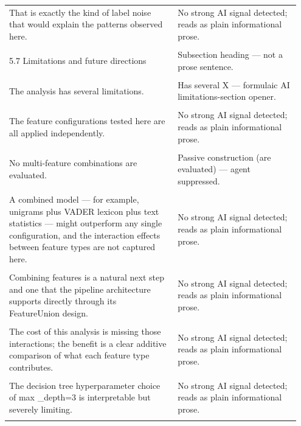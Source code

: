 \documentclass[11pt]{article}
\begin{document}
\begin{longtable}{|p{0.55\linewidth}|p{0.40\linewidth}|}
\hline
\rule{0pt}{3.5cm} & \\
\hline
That is exactly the kind of label noise that would explain the patterns observed here. & No strong AI signal detected; reads as plain informational prose. \\[2pt]
\hline
\rule{0pt}{3.5cm} & \\
\hline
5.7 Limitations and future directions & Subsection heading --- not a prose sentence. \\[2pt]
\hline
\rule{0pt}{3.5cm} & \\
\hline
The analysis has several limitations. & Has several X --- formulaic AI limitations-section opener. \\[2pt]
\hline
\rule{0pt}{3.5cm} & \\
\hline
The feature configurations tested here are all applied independently. & No strong AI signal detected; reads as plain informational prose. \\[2pt]
\hline
\rule{0pt}{3.5cm} & \\
\hline
No multi-feature combinations are evaluated. & Passive construction (are evaluated) --- agent suppressed. \\[2pt]
\hline
\rule{0pt}{3.5cm} & \\
\hline
A combined model --- for example, unigrams plus VADER lexicon plus text statistics --- might outperform any single configuration, and the interaction effects between feature types are not captured here. & No strong AI signal detected; reads as plain informational prose. \\[2pt]
\hline
\rule{0pt}{3.5cm} & \\
\hline
Combining features is a natural next step and one that the pipeline architecture supports directly through its FeatureUnion design. & No strong AI signal detected; reads as plain informational prose. \\[2pt]
\hline
\rule{0pt}{3.5cm} & \\
\hline
The cost of this analysis is missing those interactions; the benefit is a clear additive comparison of what each feature type contributes. & No strong AI signal detected; reads as plain informational prose. \\[2pt]
\hline
\rule{0pt}{3.5cm} & \\
\hline
The decision tree hyperparameter choice of max \_depth=3 is interpretable but severely limiting. & No strong AI signal detected; reads as plain informational prose. \\[2pt]
\hline
\rule{0pt}{3.5cm} & \\

\end{longtable}
\end{document}
